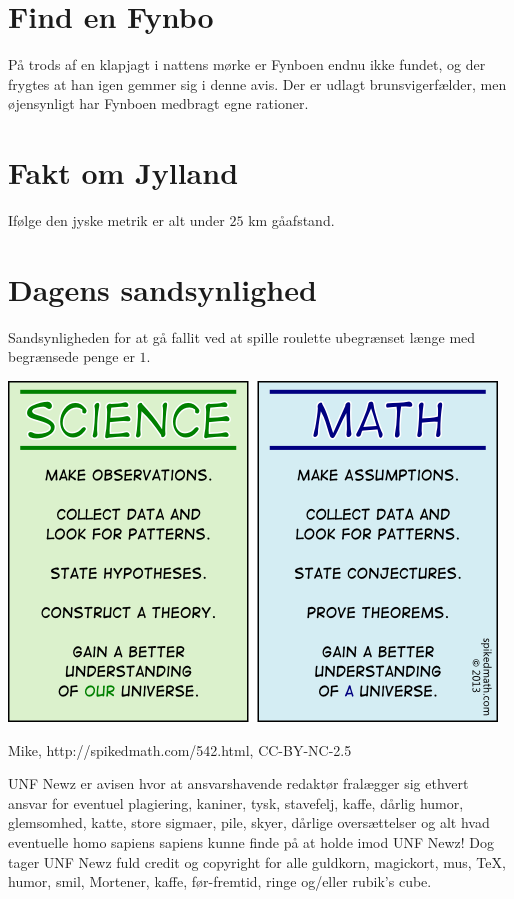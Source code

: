 \begin{minipage}[b]{0.95\linewidth}
\begin{minipage}[t]{0.47\textwidth}
\section*{Find en Fynbo}
På trods af en klapjagt i nattens mørke er Fynboen endnu ikke fundet, og der frygtes at han igen gemmer sig i denne avis. Der er udlagt brunsvigerfælder, men øjensynligt har Fynboen medbragt egne rationer.

\section*{Fakt om Jylland}
Ifølge den jyske metrik er alt under $25$ km gåafstand.

\section*{Dagens sandsynlighed}
Sandsynligheden for at gå fallit ved at spille roulette ubegrænset længe med begrænsede penge er $1$.

\vspace{3mm}
\end{minipage}

\includegraphics[width=\textwidth]{542-science-vs-math.png}
\begin{center}
\tiny Mike, http://spikedmath.com/542.html, CC-BY-NC-2.5

\vspace{3mm}

\tiny UNF Newz er avisen hvor at ansvarshavende redaktør fralægger sig ethvert ansvar for eventuel plagiering, kaniner, tysk, stavefelj, kaffe, dårlig humor, glemsomhed, katte, store sigmaer, pile, skyer, dårlige oversættelser og alt hvad eventuelle homo sapiens sapiens kunne finde på at holde imod UNF Newz! Dog tager UNF Newz fuld credit og copyright for alle guldkorn, magickort, mus, \TeX, humor, smil, Mortener, kaffe, før-fremtid, ringe og/eller rubik's cube.
\end{center}
\end{minipage}


